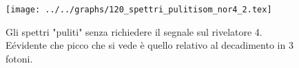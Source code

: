 \begin{figure}[h] \centering\texttt{[image: ../../graphs/120\_spettri\_pulitisom\_nor4\_2.tex]}\caption{Gli spettri "puliti" senza richiedere il segnale sul rivelatore 4. E\' evidente che picco che si vede è quello relativo al decadimento in 3 fotoni.}\label{gr:120_spettri_pulitisom_nor4_2} \end{figure}
